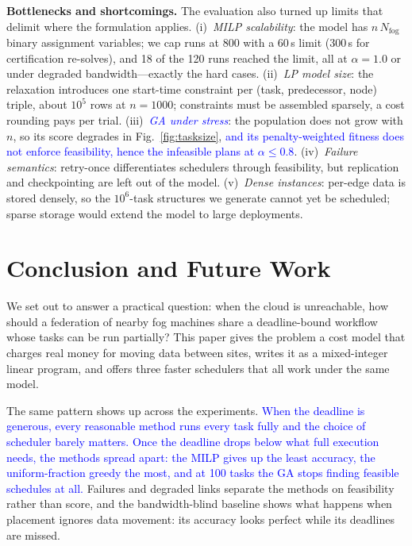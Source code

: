 \documentclass[conference]{IEEEtran}
\newcommand{\rev}[1]{\textcolor{blue}{#1}}%
\begin{document}
\textbf{Bottlenecks and shortcomings.} The evaluation also turned up limits
that delimit where the formulation applies. (i)~\emph{MILP
scalability}: the model has $n\,N_{\mathrm{fog}}$ binary assignment
variables; we cap runs at 800 with a 60\,s limit (300\,s for
certification re-solves), and 18 of the 120 runs reached the limit, all
at $\alpha{=}1.0$ or under degraded bandwidth---exactly the hard
cases. (ii)~\emph{LP model size}: the relaxation introduces one
start-time constraint per (task, predecessor, node) triple, about
$10^5$ rows at $n{=}1000$; constraints must be assembled sparsely, a
cost rounding pays per trial. (iii)~\emph{\rev{GA under stress}}: the population does not grow with $n$,
so its score degrades in Fig.~\ref{fig:tasksize}, \rev{and its
penalty-weighted fitness does not enforce feasibility, hence the
infeasible plans at $\alpha\le0.8$}. (iv)~\emph{Failure semantics}: retry-once differentiates
schedulers through feasibility, but replication and checkpointing are
left out of the model. (v)~\emph{Dense instances}: per-edge data is
stored densely, so the $10^6$-task structures we generate cannot yet be
scheduled; sparse storage would extend the model to large deployments.

\section{Conclusion and Future Work}

We set out to answer a practical question: when the cloud is unreachable, how should a federation of nearby fog machines share a deadline-bound workflow whose tasks can be run partially? This paper gives the problem a cost model that charges real money for moving data between sites, writes it as a mixed-integer linear program, and offers three faster schedulers that all work under the same model.

The same pattern shows up across the experiments. \rev{When the deadline is generous, every reasonable method runs every task fully and the choice of scheduler barely matters. Once the deadline drops below what full execution needs, the methods spread apart: the MILP gives up the least accuracy, the uniform-fraction greedy the most, and at 100 tasks the GA stops finding feasible schedules at all.} Failures and degraded links separate the methods on feasibility rather than score, and the bandwidth-blind baseline shows what happens when placement ignores data movement: its accuracy looks perfect while its deadlines are missed.
\end{document}
